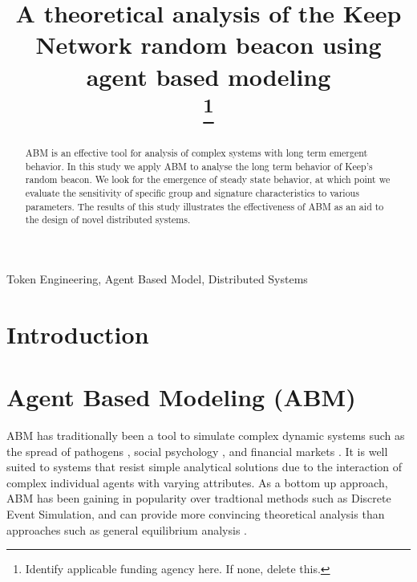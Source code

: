 \documentclass[conference]{IEEEtran}
\begin{document}
\title{A theoretical analysis of the Keep Network random beacon using agent based modeling \\
\thanks{Identify applicable funding agency here. If none, delete this.}
}

\author{

\and
{}

\and
{}

\and
{}

\and
{}
}

\maketitle

\begin{abstract}
    ABM is an effective tool for analysis of complex systems with long term 
    emergent behavior. In this study we apply ABM to analyse the long term 
    behavior of Keep’s random beacon. We look for the emergence of steady 
    state behavior, at which point we evaluate the sensitivity of specific 
    group and signature characteristics to various parameters. The results 
    of this study illustrates the effectiveness of ABM as an aid to the design 
    of novel distributed systems. 

\end{abstract}

\begin{IEEEkeywords}
Token Engineering, Agent Based Model, Distributed Systems
\end{IEEEkeywords}

\section{Introduction}

\section{Agent Based Modeling (ABM)}
ABM has traditionally been a tool to simulate complex dynamic systems 
such as the spread of pathogens \cite{Bauer2009}, social psychology 
\cite{Smith2007}, and financial markets \cite{Feng2012}. It is well suited
to systems that resist simple analytical solutions due to the interaction of 
complex individual agents with varying attributes. As a bottom up approach, ABM
has been gaining in popularity over tradtional methods such as Discrete Event
Simulation, and can provide more convincing theoretical analysis than approaches
such as general equilibrium analysis \cite{Wang2018}.
\end{document}
